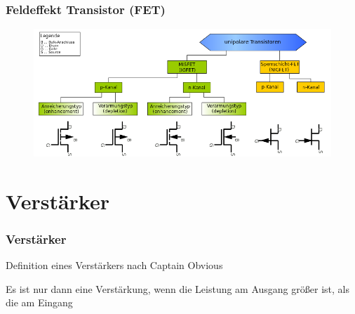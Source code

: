 \begin{frame}
  \frametitle{Feldeffekt Transistor (FET)}
  \begin{center}
    \begin{figure}
      \includegraphics[width=\textwidth,height=.65\textheight,keepaspectratio]{e13/FET-overview.png}
    \end{figure}
  \end{center}
\end{frame}

\section{Verstärker}
\begin{frame}
  \frametitle{Verstärker}
  \begin{center}
    \begin{block}{Definition eines Verstärkers nach Captain Obvious}
      \begin{Large}
        Es ist nur dann eine Verstärkung, wenn die Leistung am Ausgang größer ist, als die am Eingang
      \end{Large}
    \end{block}
  \end{center}
\end{frame}

